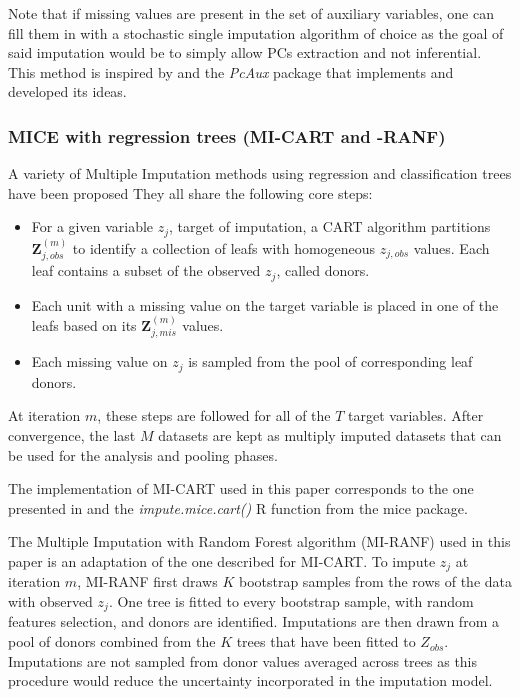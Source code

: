 	Note that if missing values are present in the set of auxiliary variables, one can fill them in with a 
	stochastic single imputation algorithm of choice as the goal of said imputation would be to simply
	allow PCs extraction and not inferential. This method is inspired by \cite{howardEtAl:2015} and the
	\emph{PcAux} package that implements and developed its ideas.
	
\subsubsection{MICE with regression trees (MI-CART and -RANF)}
	A variety of Multiple Imputation methods using regression and classification trees have been proposed
	\citep{reiter:2005, burgetteReiter:2010, shahEtAl:2014}
	They all share the following core steps:

	\begin{itemize}

	\item For a given variable $z_j$, target of imputation, a CART algorithm partitions 
		$\bm{Z}_{j, obs}^{(m)}$ to identify a collection of leafs with homogeneous 
		$z_{j,obs}$ values. Each leaf contains a subset of the observed $z_j$, called donors.

	\item Each unit with a missing value on the target variable is placed in one of the leafs based on its 
		$\bm{Z}_{j, mis}^{(m)}$ values.

	\item Each missing value on $z_{j}$ is sampled from the pool of corresponding leaf donors.

	\end{itemize}

	At iteration $m$, these steps are followed for all of the $T$ target variables. 
	After convergence, the last $M$ datasets are kept as multiply imputed datasets that can be used for the 
	analysis and pooling phases.

	The implementation of MI-CART used in this paper corresponds to the one presented in 
	\cite[p. 95, algorithm 1]{dooveEtAl:2014}
	and the \emph{impute.mice.cart()} R function from the mice package.

	The Multiple Imputation with Random Forest algorithm (MI-RANF) used in this paper is an adaptation 
	of the one described for MI-CART. 
	To impute $z_j$ at iteration $m$, MI-RANF first draws $K$ bootstrap samples from the 
	rows of the data with observed $z_j$. 
	One tree is fitted to every bootstrap sample, with random features selection, and donors are identified. 
	Imputations are then drawn from a pool of donors combined from the $K$ trees that have been fitted to $Z_{obs}$. 
	Imputations are not sampled from donor values averaged across trees as this procedure would reduce the 
	uncertainty incorporated in the imputation model.

